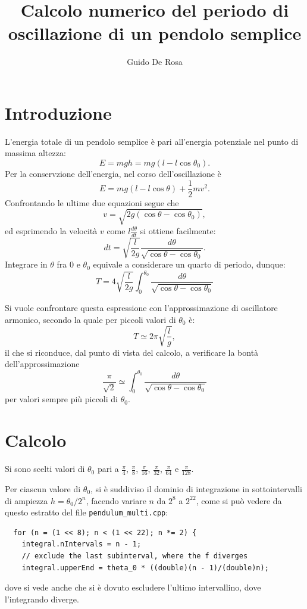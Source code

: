 \documentclass[a4paper]{article}
\author{Guido De Rosa}
\begin{document}
\title{Calcolo numerico del periodo di oscillazione di un pendolo semplice}

\maketitle

\section{Introduzione}

L'energia totale di un pendolo semplice è pari all'energia potenziale
nel punto di massima altezza:
\begin{equation*}
  E = mgh = mg(l - l\cos{\theta_0}) .
\end{equation*}
Per la conservzione dell'energia, nel corso dell'oscillazione è 
\[
  E = mg(l - l\cos{\theta}) + \frac{1}{2}mv^2 . 
\]
Confrontando le ultime due equazioni segue che
\[
  v = \sqrt{2g(\cos{\theta} - \cos{\theta_0})} ,
\] 
ed esprimendo la velocità $v$ come $l\frac{d\theta}{dt}$ si ottiene facilmente:
\[
  dt = \sqrt{\frac{l}{2g}}\frac{d\theta}{\sqrt{\cos{\theta} - \cos{\theta_0} }} .
\]
Integrare in $\theta$ fra $0$ e $\theta_0$ equivale a considerare un quarto di periodo, 
dunque:
\[
  T = 4 \sqrt{\frac{l}{2g}} \int_{0}^{\theta_0}\frac{d\theta}{\sqrt{\cos{\theta}-\cos{\theta_0}}}
\]

Si vuole confrontare questa espressione con l'approssimazione di oscillatore armonico, 
secondo la quale per piccoli valori di $\theta_0$ è:
\[
  T \simeq 2\pi \sqrt{\frac{l}{g}} ,
\]
il che si riconduce, dal punto di vista del calcolo, a verificare la bontà 
dell'approssimazione
\[
  \frac{\pi}{\sqrt{2}} \simeq \int_{0}^{\theta_0}\frac{d\theta}{\sqrt{\cos{\theta}-\cos{\theta_0}}}
\]
per valori sempre più piccoli di $\theta_0$.

\section{Calcolo}
Si sono scelti valori di $\theta_0$ pari a $\frac{\pi}{4}$, $\frac{\pi}{8}$,
$\frac{\pi}{16}$, $\frac{\pi}{32}$, $\frac{\pi}{64}$ e $\frac{\pi}{128}$.  

Per ciascun valore di $\theta_0$, si è suddiviso il dominio di integrazione in sottointervalli
di ampiezza $h = \theta_0/2^{n}$, facendo variare $n$ da $2^{8}$ a $2^{22}$, come si può
vedere da questo estratto del file \texttt{pendulum\_multi.cpp}:
\begin{lstlisting} 
  for (n = (1 << 8); n < (1 << 22); n *= 2) {
    integral.nIntervals = n - 1;
    // exclude the last subinterval, where the f diverges
    integral.upperEnd = theta_0 * ((double)(n - 1)/(double)n);
\end{lstlisting}
dove si vede anche che si è dovuto escludere l'ultimo intervallino, dove l'integrando
diverge.
\end{document}

